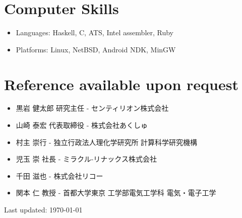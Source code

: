 \documentclass[letterpaper]{article}
\def\footer{
  \begin{center}
    \begin{footnotesize}
      Last updated: \today
    \end{footnotesize}
  \end{center}
}
\begin{document}
\section*{Computer Skills}

\begin{itemize}
  \item Languages: Haskell, C, ATS, Intel assembler, Ruby
  \item Platforms: Linux, NetBSD, Android NDK, MinGW
\end{itemize}

\section*{Reference available upon request}

\begin{itemize}
  \item 黒岩 健太郎 研究主任 - センティリオン株式会社
  \item 山崎 泰宏 代表取締役 - 株式会社あくしゅ
  \item 村主 崇行 - 独立行政法人理化学研究所 計算科学研究機構
  \item 児玉 崇 社長 - ミラクル-リナックス株式会社
  \item 千田 滋也 - 株式会社リコー
  \item 関本 仁 教授 - 首都大学東京 工学部電気工学科 電気・電子工学
\end{itemize}

\bigskip
\footer
\end{document}
